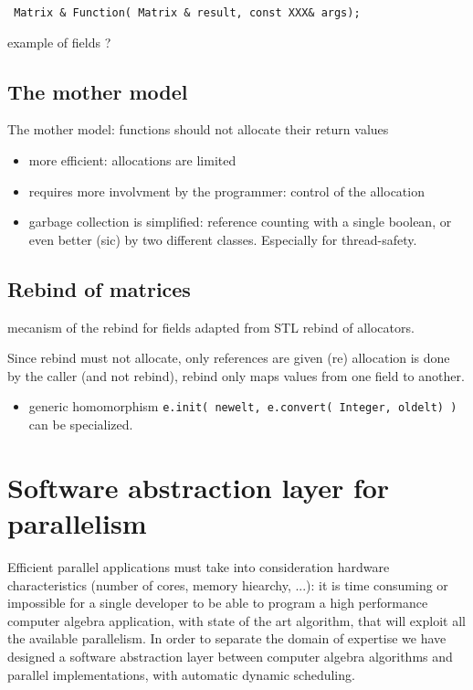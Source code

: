 \documentclass[runningheads,a4paper]{llncs}
\begin{document}
\verb! Matrix & Function( Matrix & result, const XXX& args); !

example of fields \cite[\S 2.1]{jgd:2002:icms} ?

\subsection{The mother model}


The mother model: functions should not allocate their return values

\begin{itemize}
\item more efficient: allocations are limited

\item requires more involvment by the programmer: control of the allocation

\item garbage collection is simplified: reference counting with a single
boolean, or even better (sic) by two different classes.
Especially for thread-safety.
\end{itemize}


\subsection{Rebind of matrices}

mecanism of the rebind for fields adapted from STL rebind of
allocators.

Since rebind must not allocate, only references are given (re)
allocation is done by the caller (and not rebind), rebind only maps
values from one field to another.

\begin{itemize}
\item generic homomorphism 
\verb!e.init( newelt, e.convert( Integer, oldelt) )!
can be specialized.
\end{itemize}

\section{Software abstraction layer for parallelism}

Efficient parallel applications must take into consideration hardware
characteristics (number of cores, memory hiearchy, ...): it is time
consuming or impossible for a single developer to be able to
program a high performance computer algebra application, with state of
the art algorithm, that will exploit all the available parallelism.  
In order to separate the domain of expertise we have designed a
software abstraction layer between computer algebra algorithms
and parallel implementations, with automatic dynamic scheduling.
\end{document}

